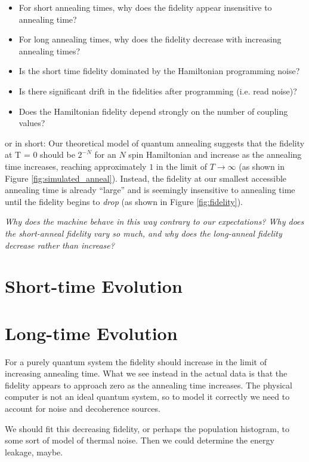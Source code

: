 \begin{itemize}
	\item For short annealing times, why does the fidelity appear insensitive to annealing time?
	\item For long annealing times, why does the fidelity decrease with increasing annealing times?
	\item Is the short time fidelity dominated by the Hamiltonian programming noise?
	\item Is there significant drift in the fidelities after programming (i.e. read noise)?
	\item Does the Hamiltonian fidelity depend strongly on the number of coupling values?
\end{itemize}

or in short: Our theoretical model of quantum annealing suggests that the fidelity at T = 0 should be $2^{-N}$ for an $N$ spin Hamiltonian and increase as the annealing time increases, reaching approximately $1$ in the limit of $T \rightarrow \infty$ (as shown in Figure \ref{fig:simulated_anneal}).  Instead, the fidelity at our smallest accessible annealing time is already ``large'' and is seemingly insensitive to annealing time until the fidelity begins to \emph{drop} (as shown in Figure \ref{fig:fidelity}).

\emph{Why does the machine behave in this way contrary to our expectations?  Why does the short-anneal fidelity vary so much, and why does the long-anneal fidelity decrease rather than increase?}

\section{Short-time Evolution}


\section{Long-time Evolution}
For a purely quantum system the fidelity should increase in the limit of increasing annealing time.  What we see instead in the actual data is that the fidelity appears to approach zero as the annealing time increases.  The physical computer is not an ideal quantum system, so to model it correctly we need to account for noise and decoherence sources.

We should fit this decreasing fidelity, or perhaps the population histogram, to some sort of model of thermal noise.  Then we could determine the energy leakage, maybe.


